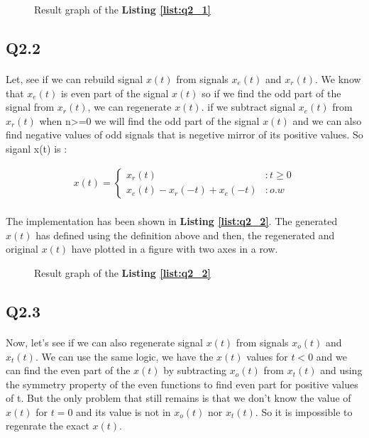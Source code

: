 
\begin{figure}[H]
  \centering
  \scalebox{0.4}{}
  \caption{Result graph of the \textbf{Listing \ref{list:q2_1}}}
  \label{fig:Q2_1}
\end{figure}

\subsection{Q2.2}
\paragraph{}Let, see if we can rebuild signal 
$x(t)$ from signals $x_e(t)$ and $x_r(t)$. We 
know that $x_e(t)$ is even part of the signal 
$x(t)$ so if we find the odd part of the signal 
from $x_r(t)$, we can regenerate $x(t)$. if we 
subtract signal $x_e(t)$ from $x_r(t)$ when n>=0 
we will find the odd part of the signal $x(t)$ and
 we can also find negative values of odd signals that is 
 negetive mirror of its positive values. So siganl x(t) is : 

 \begin{align}
  x(t) = \begin{cases}
  x_r(t) &: t \geq 0\\
  x_e(t) -x_r(-t)+x_e(-t)&: o.w\end{cases}
 \end{align}
\paragraph{}The implementation has been shown 
in \textbf{Listing \ref{list:q2_2}}. The generated 
$x(t)$ has defined using the definition above and 
then, the regenerated and original $x(t)$ have 
plotted in a figure with two axes in a row.

\begin{figure}[H]
  \centering
  \scalebox{0.4}{}
  \caption{Result graph of the \textbf{Listing \ref{list:q2_2}}}
  \label{fig:Q2_2}
\end{figure}

\subsection{Q2.3}
\paragraph{}Now, let's see if we can also regenerate 
signal $x(t)$ from signals $x_o(t)$ and $x_t(t)$. We 
can use the same logic, we have the $x(t)$ values for 
$t<0$ and we can find the even part of the $x(t)$ 
by subtracting $x_o(t)$ from $x_t(t)$ and using the 
symmetry property of the even functions to find even 
part for positive values of t. But the only problem 
that still remains is that we don't know the value of 
$x(t)$ for $t=0$ and its value is not in $x_o(t)$ nor 
$x_t(t)$. So it is impossible to regenrate the exact 
$x(t)$.